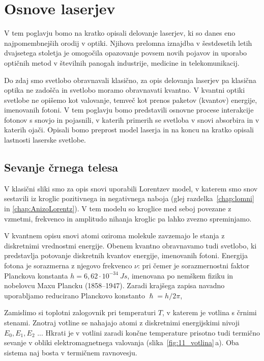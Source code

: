
\chapter{Osnove laserjev}
V tem poglavju bomo na kratko opisali delovanje laserjev, ki so 
danes eno najpomembnejših orodij v optiki. Njihova prelomna
iznajdba v šestdesetih letih dvajsetega stoletja je omogočila
opazovanje povsem novih pojavov in uporabo optičnih metod
v številnih panogah industrije, medicine in telekomunikacij.

Do zdaj smo svetlobo obravnavali klasično, za
opis delovanja laserjev pa klasična optika ne zadošča in 
svetlobo moramo obravnavati kvantno. V kvantni optiki 
svetlobe ne opišemo kot valovanje, temveč kot 
prenos paketov (kvantov) energije, imenovanih fotoni. 
V tem poglavju bomo predstavili osnovne procese interakcije 
fotonov s snovjo in pojasnili, v katerih primerih se svetloba v snovi
absorbira in v katerih ojači. Opisali bomo preprost model laserja 
in na koncu na kratko opisali lastnosti laserske svetlobe.

\section{Sevanje črnega telesa}
V klasični sliki smo za opis snovi uporabili Lorentzev model, 
v katerem smo snov sestavili iz kroglic pozitivnega in 
negativnega naboja (glej razdelka~\ref{chap:lomni} in 
\ref{chap:AnizoLorentz}).
V tem modelu so kroglice med seboj povezane z vzmetmi, frekvenco
in amplitudo nihanja kroglic pa lahko zvezno spreminjamo.

V kvantnem opisu snovi atomi oziroma molekule zavzemajo
le stanja z diskretnimi vrednostmi energije. Obenem kvantno
obravnavamo tudi svetlobo, ki predstavlja potovanje diskretnih
kvantov energije, imenovanih fotoni. 
Energija fotona je sorazmerna z njegovo frekvenco $\nu$:
pri čemer je sorazmernostni faktor Planckova konstanta
$h = 6,62 \cdot 10^{-34}~\si{Js}$, imenovana 
po nemškem fiziku in nobelovcu Maxu Plancku (1858--1947).
Zaradi krajšega zapisa navadno uporabljamo reducirano Planckovo konstanto
$\hslash = h/2\pi$, 

Zamislimo si toplotni zalogovnik pri temperaturi $T$, v katerem 
je votlina s črnimi stenami. Znotraj votline se nahajajo atomi z diskretnimi
energijskimi nivoji $E_0, E_1, E_2$ ... Hkrati je v votlini zaradi 
končne temperature prisotno tudi termično sevanje v obliki 
elektromagnetnega valovanja (slika~\ref{fig:11_votlina}\,a). 
Oba sistema naj bosta v termičnem ravnovesju.

